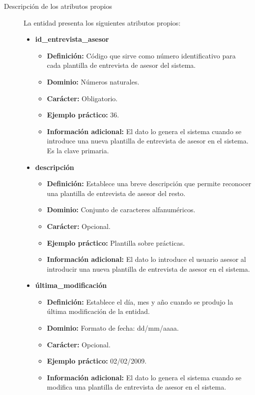 \begin{description}
   \item[Descripción de los atributos propios] La entidad presenta los
   siguientes atributos propios:

   \begin{itemize}
    \item \textbf{id\_entrevista\_asesor}
      \begin{itemize}
         \item \textbf{Definición:} Código que sirve como número identificativo
               para cada plantilla de entrevista de asesor del sistema.
         \item \textbf{Dominio:} Números naturales.
         \item \textbf{Carácter:} Obligatorio.
         \item \textbf{Ejemplo práctico:} 36.
         \item \textbf{Información adicional:} El dato lo genera el sistema
               cuando se introduce una nueva plantilla de entrevista de asesor
               en el sistema. Es la clave primaria.
      \end{itemize}
    \item \textbf{descripción}
      \begin{itemize}
         \item \textbf{Definición:} Establece una breve descripción que permite
         reconocer una plantilla de entrevista de asesor del resto.
         \item \textbf{Dominio:} Conjunto de caracteres alfanuméricos.
         \item \textbf{Carácter:} Opcional.
         \item \textbf{Ejemplo práctico:} Plantilla sobre prácticas.
         \item \textbf{Información adicional:} El dato lo introduce el
         usuario asesor al introducir una nueva plantilla de entrevista de
         asesor en el sistema.
      \end{itemize}
    \item \textbf{última\_modificación}
      \begin{itemize}
         \item \textbf{Definición:} Establece el día, mes y año cuando se
            produjo la última modificación de la entidad.
         \item \textbf{Dominio:} Formato de fecha: dd/mm/aaaa.
         \item \textbf{Carácter:} Opcional.
         \item \textbf{Ejemplo práctico:} 02/02/2009.
         \item \textbf{Información adicional:} El dato lo genera el sistema
               cuando se modifica una plantilla de entrevista de asesor en
               el sistema.
      \end{itemize}
   \end{itemize}


\end{description}
